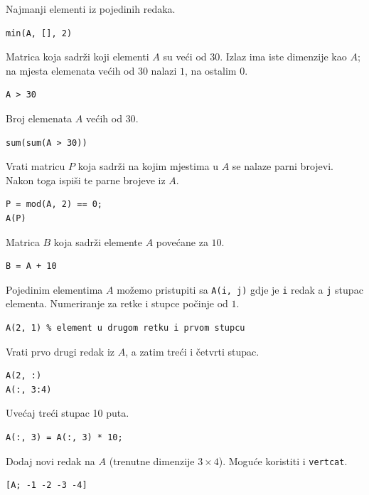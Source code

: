 \documentclass[a4paper, 10pt]{article}
\begin{document}
Najmanji elementi iz pojedinih redaka.

\begin{lstlisting}
min(A, [], 2)
\end{lstlisting}

Matrica koja sadrži koji elementi $A$ su veći od $30$. Izlaz ima iste dimenzije kao $A$; na mjesta elemenata većih od $30$ nalazi $1$, na ostalim $0$.

\begin{lstlisting}
A > 30
\end{lstlisting}

Broj elemenata $A$ većih od $30$.

\begin{lstlisting}
sum(sum(A > 30))
\end{lstlisting}

Vrati matricu $P$ koja sadrži na kojim mjestima u $A$ se nalaze parni brojevi. Nakon toga ispiši te parne brojeve iz $A$.

\begin{lstlisting}
P = mod(A, 2) == 0;
A(P)
\end{lstlisting}

Matrica $B$ koja sadrži elemente $A$ povećane za $10$.

\begin{lstlisting}
B = A + 10
\end{lstlisting}

Pojedinim elementima $A$ možemo pristupiti sa \texttt{A(i, j)} gdje je \texttt{i} redak a \texttt{j} stupac elementa. Numeriranje za retke i stupce počinje od $1$.

\begin{lstlisting}
A(2, 1) % element u drugom retku i prvom stupcu
\end{lstlisting}

Vrati prvo drugi redak iz $A$, a zatim treći i četvrti stupac.

\begin{lstlisting}
A(2, :)
A(:, 3:4)
\end{lstlisting}

Uvećaj treći stupac 10 puta.

\begin{lstlisting}
A(:, 3) = A(:, 3) * 10;
\end{lstlisting}

Dodaj novi redak na $A$ (trenutne dimenzije $3 \times 4$). Moguće koristiti i \texttt{vertcat}.

\begin{lstlisting}
[A; -1 -2 -3 -4]
\end{lstlisting}
\end{document}
